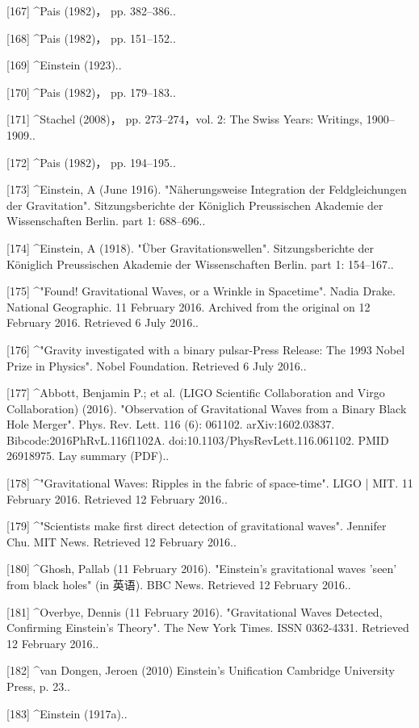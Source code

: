 [167]
^Pais (1982)， pp. 382–386..

[168]
^Pais (1982)， pp. 151–152..

[169]
^Einstein (1923)..

[170]
^Pais (1982)， pp. 179–183..

[171]
^Stachel (2008)， pp. 273–274，vol. 2: The Swiss Years: Writings, 1900–1909..

[172]
^Pais (1982)， pp. 194–195..

[173]
^Einstein, A (June 1916). "Näherungsweise Integration der Feldgleichungen der Gravitation". Sitzungsberichte der Königlich Preussischen Akademie der Wissenschaften Berlin. part 1: 688–696..

[174]
^Einstein, A (1918). "Über Gravitationswellen". Sitzungsberichte der Königlich Preussischen Akademie der Wissenschaften Berlin. part 1: 154–167..

[175]
^"Found! Gravitational Waves, or a Wrinkle in Spacetime". Nadia Drake. National Geographic. 11 February 2016. Archived from the original on 12 February 2016. Retrieved 6 July 2016..

[176]
^"Gravity investigated with a binary pulsar-Press Release: The 1993 Nobel Prize in Physics". Nobel Foundation. Retrieved 6 July 2016..

[177]
^Abbott, Benjamin P.; et al. (LIGO Scientific Collaboration and Virgo Collaboration) (2016). "Observation of Gravitational Waves from a Binary Black Hole Merger". Phys. Rev. Lett. 116 (6): 061102. arXiv:1602.03837. Bibcode:2016PhRvL.116f1102A. doi:10.1103/PhysRevLett.116.061102. PMID 26918975. Lay summary (PDF)..

[178]
^"Gravitational Waves: Ripples in the fabric of space-time". LIGO | MIT. 11 February 2016. Retrieved 12 February 2016..

[179]
^"Scientists make first direct detection of gravitational waves". Jennifer Chu. MIT News. Retrieved 12 February 2016..

[180]
^Ghosh, Pallab (11 February 2016). "Einstein's gravitational waves 'seen' from black holes" (in 英语). BBC News. Retrieved 12 February 2016..

[181]
^Overbye, Dennis (11 February 2016). "Gravitational Waves Detected, Confirming Einstein's Theory". The New York Times. ISSN 0362-4331. Retrieved 12 February 2016..

[182]
^van Dongen, Jeroen (2010) Einstein's Unification Cambridge University Press, p. 23..

[183]
^Einstein (1917a)..

